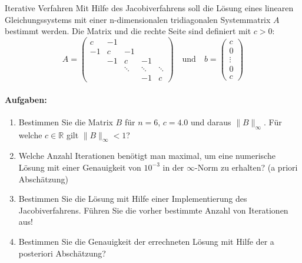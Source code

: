 \begin{example2}{Iterative Verfahren}
Mit Hilfe des Jacobiverfahrens soll die Lösung eines linearen Gleichungssystems mit einer n-dimensionalen tridiagonalen Systemmatrix $A$ bestimmt werden. Die Matrix und die rechte Seite sind definiert mit $c > 0$:
$$A = \begin{pmatrix}
c & -1 & & & \\
-1 & c & -1 & & \\
& -1 & c & -1 & \\
& & \ddots & \ddots & \ddots \\
& & & -1 & c
\end{pmatrix}
\quad \text{und} \quad
b = \begin{pmatrix}
c\\
0\\
\vdots\\
0\\
c
\end{pmatrix}$$

\paragraph{Aufgaben:}
\begin{enumerate}
    \item Bestimmen Sie die Matrix $B$ für $n=6$, $c=4.0$ und daraus $\|B\|_\infty$. Für welche $c \in \mathbb{R}$ gilt $\|B\|_\infty < 1$?
    
    \item Welche Anzahl Iterationen benötigt man maximal, um eine numerische Lösung mit einer Genauigkeit von $10^{-3}$ in der $\infty$-Norm zu erhalten? (a priori Abschätzung)
    
    \item Bestimmen Sie die Lösung mit Hilfe einer Implementierung des Jacobiverfahrens. Führen Sie die vorher bestimmte Anzahl von Iterationen aus!
    
    \item Bestimmen Sie die Genauigkeit der errechneten Lösung mit Hilfe der a posteriori Abschätzung?
\end{enumerate}
\end{example2}

